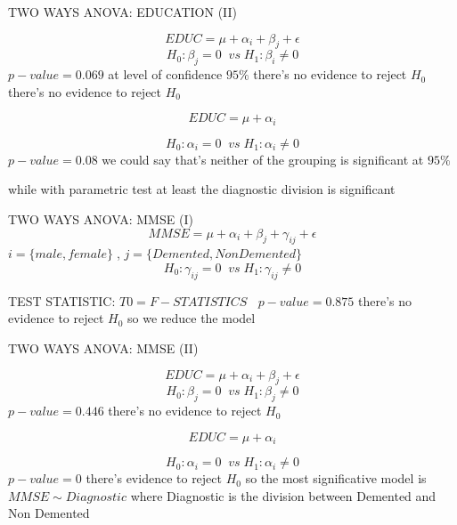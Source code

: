 \documentclass{beamer}
\begin{document}
\begin{frame}{TWO WAYS ANOVA: EDUCATION (II)}

	$$ EDUC =  \mu + \alpha_i + \beta_j  + \epsilon $$
	$$
	H_0: \beta_j=0\; \;vs\;H_1:\beta_i\neq0 
	$$
	$p-value = 0.069$
	at level of confidence $ 95\% $ there's no evidence to	reject $H_0$ there's no  evidence to reject $H_0$ 
	
	$$ EDUC =  \mu + \alpha_i  $$
	
		$$
	H_0:\alpha_i=0\; \;vs\;H_1:\alpha_i\neq0
	$$
	$p-value = 0.08 $
we could say that's neither of the grouping is significant at $95\%$ 

while with parametric test at least the diagnostic division is significant
\end{frame}
	\begin{frame}{ TWO WAYS ANOVA: MMSE (I)}
	$$ MMSE =   \mu + \alpha_i + \beta_j + \gamma_{ij} + \epsilon $$
		$ i =\{male,female\} \;$,
	$ j=\{ Demented, Non Demented \}$
	$$
	H_0: \gamma_{ij}=0\; \;vs\;H_1:\gamma_{ij}\neq0 
	$$
	
	TEST STATISTIC: $ T0= F-STATISTICS \;$
	$\; p-value = 0.875 $
	there's no evidence to	reject $H_0$ 
	so we reduce the model
	
	
\end{frame}

\begin{frame}{TWO WAYS ANOVA: MMSE (II)}

	$$ EDUC =   \mu + \alpha_i + \beta_j  + \epsilon  $$
	$$
	H_0:\beta_j=0\; \;vs\;H_1:\beta_j\neq0 
	$$
	$p-value = 0.446$
	there's no evidence to reject $H_0$
	
	$$ EDUC =  \mu + \alpha_i $$
	
	$$
	H_0: \alpha_i =0\; \;vs\;H_1:\alpha_i \neq0 
	$$
	$p-value = 0$
	there's evidence to reject $H_0 $ 
	so the most significative model is $ MMSE \sim Diagnostic$
	where Diagnostic is the division between Demented and Non Demented
	\end{frame}
\end{document}
